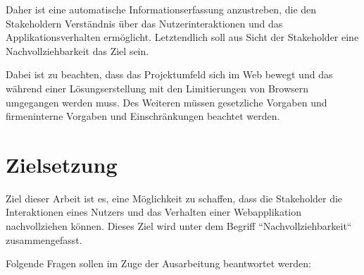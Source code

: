 Daher ist eine automatische Informationserfassung anzustreben, die den Stakeholdern Verständnis über das Nutzerinteraktionen und das Applikationsverhalten ermöglicht. Letztendlich soll aus Sicht der Stakeholder eine Nachvollziehbarkeit das Ziel sein.

Dabei ist zu beachten, dass das Projektumfeld sich im Web bewegt und das während einer Lösungserstellung mit den Limitierungen von Browsern umgegangen werden muss. Des Weiteren müssen gesetzliche Vorgaben und firmeninterne Vorgaben und Einschränkungen beachtet werden.

\section{Zielsetzung}


Ziel dieser Arbeit ist es, eine Möglichkeit zu schaffen, dass die Stakeholder die Interaktionen eines Nutzers und das Verhalten einer Webapplikation nachvollziehen können. Dieses Ziel wird unter dem Begriff ``Nachvollziehbarkeit`` zusammengefasst.

Folgende Fragen sollen im Zuge der Ausarbeitung beantwortet werden:


